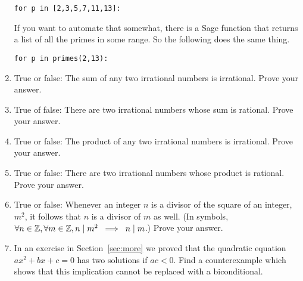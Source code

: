 \begin{enumerate}
{{\tt for p in [2,3,5,7,11,13]:}

\noindent If you want to automate that somewhat, there is a Sage function that returns a list
of all the primes in some range.  So the following does the same thing.

{\tt for p in primes(2,13):}


}
\item True or false:  The sum of any two irrational numbers is irrational.
Prove your answer.


\item True of false:  There are two irrational numbers whose sum is rational.
Prove your answer.


\item True or false: The product of any two irrational numbers is irrational.
Prove your answer.


\item True or false: There are two irrational numbers whose product is rational.
Prove your answer.


\item True or false:  Whenever an integer $n$ is a divisor of the square of an integer, $m^2$, it follows that $n$ is a divisor of $m$ as well.
(In symbols, $\forall n \in {\mathbb Z}, \forall m \in {\mathbb Z}, n \mid m^2 \; \implies \; n \mid m$.)
Prove your answer.


\item In an exercise in Section~\ref{sec:more} we proved that the quadratic 
equation $ax^2 + bx + c = 0$ has two solutions if $ac < 0$.  Find a counterexample which shows that this implication cannot be replaced with a biconditional.  



\end{enumerate}
